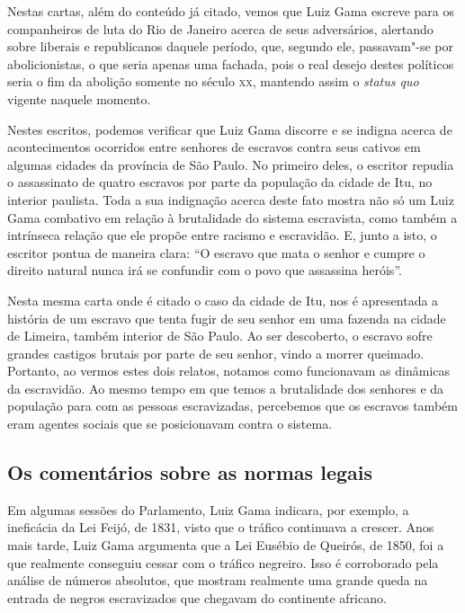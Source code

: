 \documentclass[12pt]{extarticle}
\begin{document}
Nestas cartas, além do conteúdo já citado, vemos que Luiz Gama escreve
para os companheiros de luta do Rio de Janeiro acerca de seus
adversários, alertando sobre liberais e republicanos daquele período,
que, segundo ele, passavam"-se por abolicionistas, o que seria apenas uma
fachada, pois o real desejo destes políticos seria o fim da abolição
somente no século \textsc{xx}, mantendo assim o \textit{status quo} vigente naquele
momento.




Nestes escritos, podemos verificar que Luiz Gama discorre e se indigna
acerca de acontecimentos ocorridos entre senhores de escravos contra
seus cativos em algumas cidades da província de São Paulo. No primeiro
deles, o escritor repudia o assassinato de quatro escravos por parte da
população da cidade de Itu, no interior paulista. Toda a sua indignação
acerca deste fato mostra não só um Luiz Gama combativo em relação à
brutalidade do sistema escravista, como também a intrínseca relação que
ele propõe entre racismo e escravidão. E, junto a isto, o escritor pontua
de maneira clara: ``O escravo que mata o senhor e cumpre o direito
natural nunca irá se confundir com o povo que assassina heróis''.



Nesta mesma carta onde é citado o caso da cidade de Itu, nos é apresentada
a história de um escravo que tenta fugir de seu senhor em uma fazenda
na cidade de Limeira, também interior de São Paulo. Ao ser descoberto, o
escravo sofre grandes castigos brutais por parte de seu senhor, vindo a
morrer queimado. Portanto, ao vermos estes dois relatos, notamos como
funcionavam as dinâmicas da escravidão. Ao mesmo tempo em que temos a
brutalidade dos senhores e da população para com as pessoas
escravizadas, percebemos que os escravos também eram agentes sociais
que se posicionavam contra o sistema.

\subsection{Os comentários sobre as normas legais}


Em algumas sessões do Parlamento, Luiz Gama indicara, por exemplo, a ineficácia
da Lei Feijó, de 1831, visto que o tráfico continuava a crescer.
Anos mais tarde, Luiz Gama argumenta que a Lei Eusébio de Queirós, de
1850, foi a que realmente conseguiu cessar com o tráfico negreiro. 
Isso é corroborado pela análise de números absolutos,
que mostram realmente uma grande queda na entrada de negros escravizados
que chegavam do continente africano.
\end{document}
